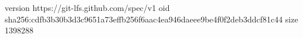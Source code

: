 version https://git-lfs.github.com/spec/v1
oid sha256:cdfb3b30b3d3c9651a73effb256f6aac4ea946daeee9be4f0f2deb3ddcf81c44
size 1398288
